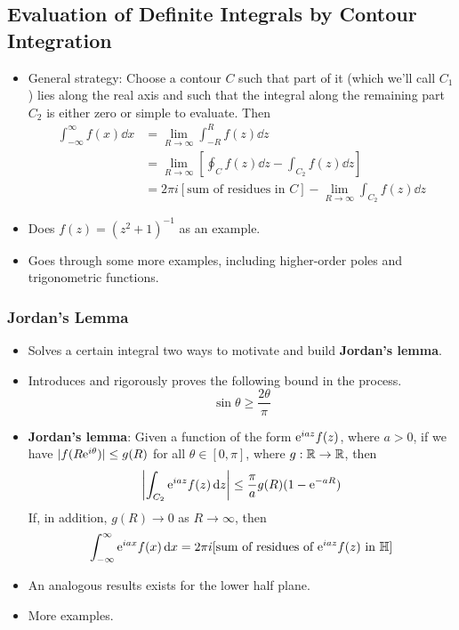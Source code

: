 \documentclass[../finalProject.tex]{subfiles}
\begin{document}
\subsection{Evaluation of Definite Integrals by Contour Integration}
\begin{itemize}
    \item General strategy: Choose a contour $C$ such that part of it (which we'll call $C_1$) lies along the real axis and such that the integral along the remaining part $C_2$ is either zero or simple to evaluate. Then
    \begin{align*}
        \int_{-\infty}^\infty f(x)\dd{x} &= \lim_{R\to\infty}\int_{-R}^Rf(z)\dd{z}\\
        &= \lim_{R\to\infty}\left[ \oint_Cf(z)\dd{z}-\int_{C_2}f(z)\dd{z} \right]\\
        &= 2\pi i[\text{sum of residues in }C]-\lim_{R\to\infty}\int_{C_2}f(z)\dd{z}
    \end{align*}
    \item Does $f(z)=(z^2+1)^{-1}$ as an example.
    \item Goes through some more examples, including higher-order poles and trigonometric functions.
\end{itemize}

\subsubsection{Jordan's Lemma}
\begin{itemize}
    \item Solves a certain integral two ways to motivate and build \textbf{Jordan's lemma}.
    \item Introduces and rigorously proves the following bound in the process.
    \begin{equation*}
        \sin\theta \geq \frac{2\theta}{\pi}
    \end{equation*}
    \item \textbf{Jordan's lemma}: Given a function of the form $\e[iaz]f(z)$, where $a>0$, if we have $|f(R\e[i\theta])|\leq g(R)$ for all $\theta\in[0,\pi]$, where $g:\R\to\R$, then
    \begin{equation*}
        \left| \int_{C_2}\e[iaz]f(z)\dd{z} \right| \leq \frac{\pi}{a}g(R)(1-\e[-aR])
    \end{equation*}
    If, in addition, $g(R)\to 0$ as $R\to\infty$, then
    \begin{equation*}
        \int_{-\infty}^\infty\e[iax]f(x)\dd{x} = 2\pi i[\text{sum of residues of }\e[iaz]f(z)\text{ in }\Hh]
    \end{equation*}
    \item An analogous results exists for the lower half plane.
    \item More examples.
\end{itemize}
\end{document}
